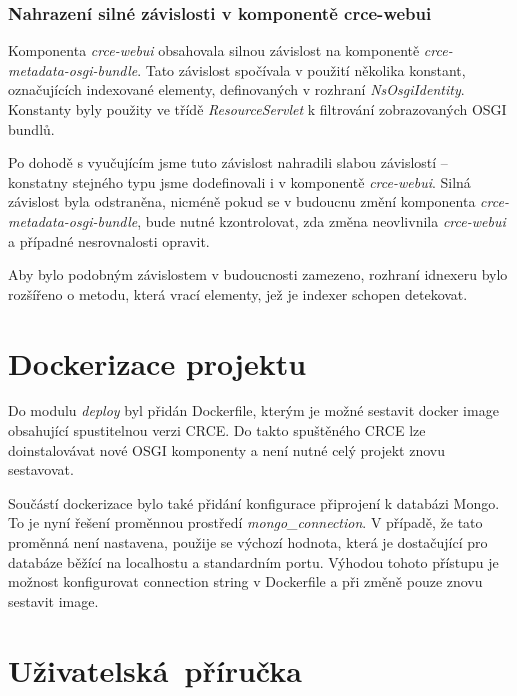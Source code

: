 \documentclass[12pt, a4paper]{article}
\begin{document}
\subsubsection{Nahrazení silné závislosti v komponentě crce-webui}
Komponenta \textit{crce-webui} obsahovala silnou závislost na komponentě \textit{crce-metadata-osgi-bundle}. Tato závislost spočívala v použití několika konstant, označujících indexované elementy, definovaných v rozhraní \textit{NsOsgiIdentity}. Konstanty byly použity ve třídě \textit{ResourceServlet} k filtrování zobrazovaných OSGI bundlů. 

Po dohodě s vyučujícím jsme tuto závislost nahradili slabou závislostí -- konstatny stejného typu jsme dodefinovali i v komponentě \textit{crce-webui}. Silná závislost byla odstraněna, nicméně pokud se v budoucnu změní komponenta \textit{crce-metadata-osgi-bundle}, bude nutné kzontrolovat, zda změna neovlivnila \textit{crce-webui} a případné nesrovnalosti opravit.

Aby bylo podobným závislostem v budoucnosti zamezeno, rozhraní idnexeru bylo rozšířeno o metodu, která vrací elementy, jež je indexer schopen detekovat. 


\section{Dockerizace projektu}
Do modulu \textit{deploy} byl přidán Dockerfile, kterým je možné sestavit docker image obsahující spustitelnou verzi CRCE. Do takto spuštěného CRCE lze doinstalovávat nové OSGI komponenty a není nutné celý projekt znovu sestavovat. 

Součástí dockerizace bylo také přidání konfigurace připrojení k databázi Mongo. To je nyní řešení proměnnou prostředí \textit{mongo\_connection}. V případě, že tato proměnná není nastavena, použije se výchozí hodnota, která je dostačující pro databáze běžící na localhostu a standardním portu. Výhodou tohoto přístupu je možnost konfigurovat connection string v Dockerfile a při změně pouze znovu sestavit image.

\section{Uživatelská~příručka} %
\end{document}
